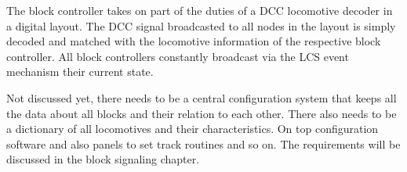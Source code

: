 The block controller takes on part of the duties of a DCC locomotive decoder in a digital layout. The DCC signal broadcasted to all nodes in the layout is simply decoded and matched with the locomotive information of the respective block controller. All block controllers constantly broadcast via the LCS event mechanism their current state.

Not discussed yet, there needs to be a central configuration system that keeps all the data about all blocks and their relation to each other. There also needs to be a dictionary of all locomotives and their characteristics. On top configuration software and also panels to set track routines and so on. The requirements will be discussed in the block signaling chapter.
